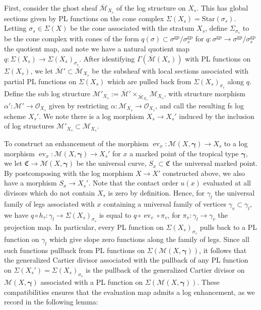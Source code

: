\documentclass[12pt, oneside]{amsart}   	%
\newcommand{\ev}{\operatorname{ev}}
\newcommand{\gp}{\operatorname{gp}}
\numberwithin{equation}{section}
\numberwithin{thm}{section}
\numberwithin{figure}{section}
\begin{document}
First, consider the ghost sheaf $\overline{\mathcal{M}}_{X_s}$ of the log structure on $X_s$. This has global sections given by PL functions on the cone complex $\Sigma(X_s) = \text{Star}(\sigma_s)$. Letting $\sigma_s \in \Sigma(X)$ be the cone associated with the stratum $X_s$, define $\Sigma_{\sigma_s}$ to be the cone complex with cones of the form $q(\sigma) \subset \sigma^{\gp}/\sigma_s^{\gp}$ for $q: \sigma^{\gp} \rightarrow \sigma^{\gp}/\sigma_s^{\gp}$ the quotient map, and note we have a natural quotient map $q: \Sigma(X_s) \rightarrow \Sigma(X_s)_{\sigma_s}$. After identifying $\Gamma(\overline{\mathcal{M}}(X_s))$ with PL functions on $\Sigma(X_s)$, we let $\overline{\mathcal{M}}' \subset \overline{\mathcal{M}}_{X_s}$ be the subsheaf with local sections associated with partial PL functions on $\Sigma(X_s)$ which are pulled back from $\Sigma(X_s)_{\sigma_s}$ along $q$. Define the sub log structure $\mathcal{M}'_{X_s} := \overline{\mathcal{M}}' \times_{\overline{\mathcal{M}}_{X_s}} \mathcal{M}_{X_s}$, with structure morphism $\alpha': \mathcal{M}' \rightarrow \mathcal{O}_{X_s}$ given by restricting $\alpha: \mathcal{M}_{X_s} \rightarrow \mathcal{O}_{X_s}$, and call the resulting fs log scheme $X_s'$. We note there is a log morphism $X_s \rightarrow X_s'$ induced by the inclusion of log structures $\mathcal{M}'_{X_s} \subset \mathcal{M}_{X_s}$. 

To construct an enhancement of the morphism $\ev_x: \mathscr{M}(X,\pmb\gamma) \rightarrow X_s$ to a log morphism $\ev_x: \mathscr{M}(X,\pmb\gamma) \rightarrow X_s'$ for $x$ a marked point of the tropical type $\pmb\gamma$, we let $\mathfrak{C} \rightarrow \mathscr{M}(X,\pmb\gamma)$ be the universal curve, $S_x \subset \mathfrak{C}$ the universal marked point. By postcomposing with the log morphism $X \rightarrow X'$ constructed above, we also have a morphism $S_x \rightarrow X_s'$. Note that the contact order $u(x)$ evaluated at all divisors which do not contain $X_s$ is zero by definition. Hence, for $\gamma_l$ the universal family of legs associated with $x$ containing a universal family of vertices $\gamma_v \subset \gamma_l$, we have $q\circ h_{\tau}: \gamma_l \rightarrow \Sigma(X_s)_{\sigma_s}$ is equal to $q \circ \ev_v \circ \pi_v$, for $\pi_v: \gamma_l \rightarrow \gamma_v$ the projection map. In particular, every PL function on $\Sigma(X_s)_{\sigma_s}$ pulls back to a PL function on $\gamma_l$ which give slope zero functions along the family of legs. Since all such functions pullback from PL functions on $\Sigma(\mathscr{M}(X,\pmb\gamma))$, it follows that the generalized Cartier divisor associated with the pullback of any PL function on $\Sigma(X_s') = \Sigma(X_s)_{\sigma_s}$ is the pullback of the generalized Cartier divisor on $\mathscr{M}(X,\pmb\gamma)$ associated with a PL function on $\Sigma(\mathscr{M}(X,\pmb\gamma))$.  These compatibilities ensures that the evaluation map admits a log enhancement, as we record in the following lemma:
\end{document}

